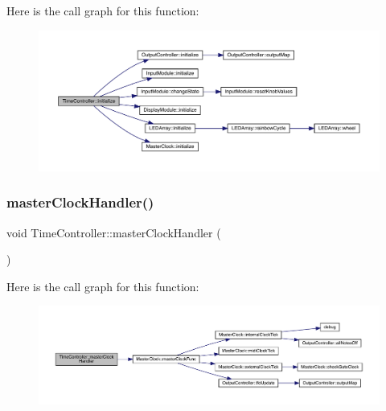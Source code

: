 Here is the call graph for this function\+:
\nopagebreak
\begin{figure}[H]
\begin{center}
\leavevmode
\includegraphics[width=350pt]{class_time_controller_ae819298bde61b72b67b067b690032280_cgraph}
\end{center}
\end{figure}
\mbox{\label{class_time_controller_af3df3fed28e3d6a6a23da80b7d9e579e}} 
\subsubsection{\texorpdfstring{master\+Clock\+Handler()}{masterClockHandler()}}
{\footnotesize\ttfamily void Time\+Controller\+::master\+Clock\+Handler (\begin{DoxyParamCaption}{ }\end{DoxyParamCaption})}

Here is the call graph for this function\+:
\nopagebreak
\begin{figure}[H]
\begin{center}
\leavevmode
\includegraphics[width=350pt]{class_time_controller_af3df3fed28e3d6a6a23da80b7d9e579e_cgraph}
\end{center}
\end{figure}
\mbox{\label{class_time_controller_a56442319aea3eaed083882a0f148fe26}} 
